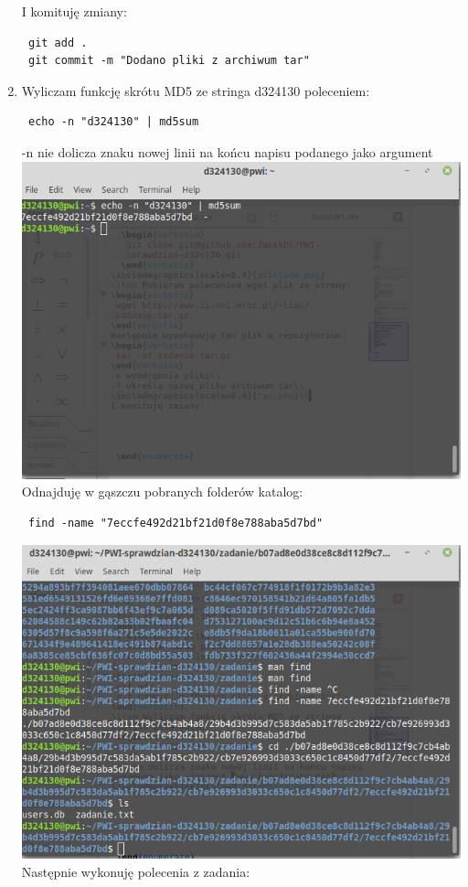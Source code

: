\documentclass{article}
\begin{document}
\begin{enumerate}
I komituję zmiany:
\begin{verbatim}
 git add .
 git commit -m "Dodano pliki z archiwum tar"
\end{verbatim}
\item Wyliczam funkcję skrótu MD5 ze stringa d324130 poleceniem:
\begin{verbatim}
 echo -n "d324130" | md5sum
\end{verbatim}
-n nie dolicza znaku nowej linii na końcu napisu podanego jako argument\cite{bytefreaks}\\
\includegraphics[scale=0.4]{md5sum.png}\\
Odnajduję w gąszczu pobranych folderów katalog:
\begin{verbatim}
 find -name "7eccfe492d21bf21d0f8e788aba5d7bd"
\end{verbatim}
\includegraphics[scale=0.4]{find.png}\\
Następnie wykonuję polecenia z zadania:


\end{enumerate}
\end{document}
